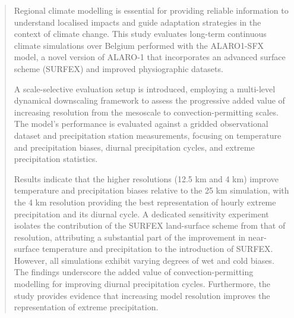 \documentclass[journal abbreviation, manuscript]{copernicus}
\begin{document}
\begin{abstract}
Regional climate modelling is essential for providing reliable information to understand localised impacts and guide adaptation strategies in the context of climate change. This study evaluates long-term continuous climate simulations over Belgium performed with the ALARO1-SFX model, a novel version of ALARO-1 that incorporates an advanced surface scheme (SURFEX) and improved physiographic datasets.

A scale-selective evaluation setup is introduced, employing a multi-level dynamical downscaling framework to assess the progressive added value of increasing resolution from the mesoscale to convection-permitting scales. The model's performance is evaluated against a gridded observational dataset and precipitation station measurements, focusing on temperature and precipitation biases, diurnal precipitation cycles, and extreme precipitation statistics.

Results indicate that the higher resolutions (12.5 km and 4 km) improve temperature and precipitation biases relative to the 25 km simulation, with the 4 km resolution providing the best representation of hourly extreme precipitation and its diurnal cycle. A dedicated sensitivity experiment isolates the contribution of the SURFEX land-surface scheme from that of resolution, attributing a substantial part of the improvement in near-surface temperature and precipitation to the introduction of SURFEX. However, all simulations exhibit varying degrees of wet and cold biases. The findings underscore the added value of convection-permitting modelling for improving diurnal precipitation cycles. Furthermore, the study provides evidence that increasing model resolution improves the representation of extreme precipitation.
\end{abstract}




\introduction  %
\end{document}
